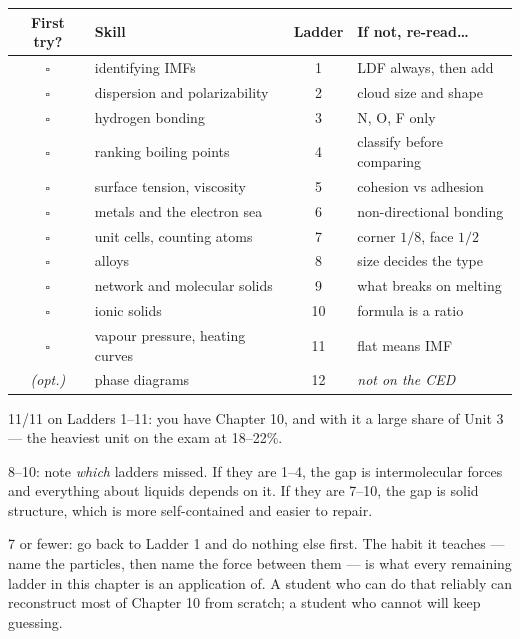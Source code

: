 \documentclass{apchem-worksheet}
\begin{document}
\renewcommand{\arraystretch}{1.3}
\noindent\begin{tabular}{@{}c p{5.9cm} c p{4.9cm}@{}}
\toprule
\textbf{First try?} & \textbf{Skill} & \textbf{Ladder} &
  \textbf{If not, re-read\ldots}\\
\midrule
$\square$ & identifying IMFs & 1 & LDF always, then add \\
$\square$ & dispersion and polarizability & 2 & cloud size and shape \\
$\square$ & hydrogen bonding & 3 & N, O, F only \\
$\square$ & ranking boiling points & 4 & classify before comparing \\
$\square$ & surface tension, viscosity & 5 & cohesion vs adhesion \\
$\square$ & metals and the electron sea & 6 & non-directional bonding \\
$\square$ & unit cells, counting atoms & 7 & corner $1/8$, face $1/2$ \\
$\square$ & alloys & 8 & size decides the type \\
$\square$ & network and molecular solids & 9 & what breaks on melting \\
$\square$ & ionic solids & 10 & formula is a ratio \\
$\square$ & vapour pressure, heating curves & 11 & flat means IMF \\
\midrule
\textit{(opt.)} & phase diagrams & 12 & \textit{not on the CED} \\
\bottomrule
\end{tabular}

\begin{apcnote}
11/11 on Ladders 1--11: you have Chapter 10, and with it a large share
of Unit 3 --- the heaviest unit on the exam at 18--22\%.

8--10: note \emph{which} ladders missed. If they are 1--4, the gap is
intermolecular forces and everything about liquids depends on it. If
they are 7--10, the gap is solid structure, which is more self-contained
and easier to repair.

7 or fewer: go back to Ladder 1 and do nothing else first. The habit it
teaches --- name the particles, then name the force between them --- is
what every remaining ladder in this chapter is an application of. A
student who can do that reliably can reconstruct most of Chapter 10 from
scratch; a student who cannot will keep guessing.
\end{apcnote}
\end{document}
